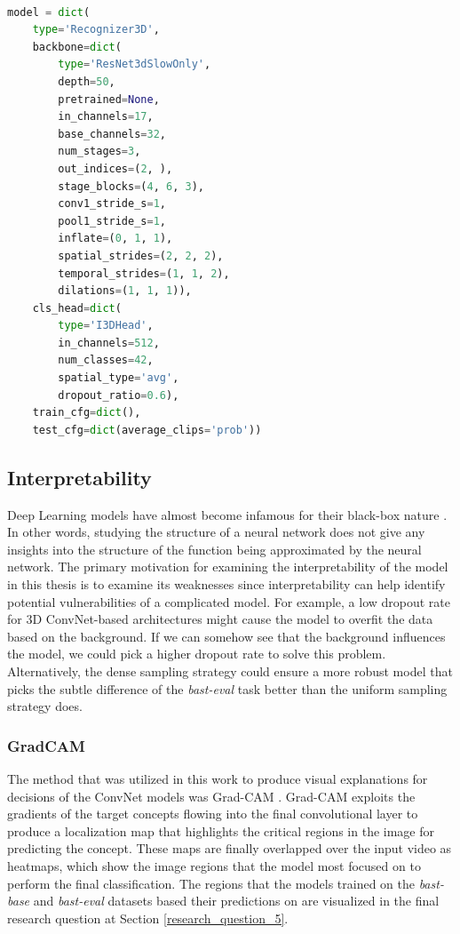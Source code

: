 \documentclass[extern,palatino]{cgMA}
\begin{document}
\bigskip \bigskip \bigskip
\vspace{5mm}
\begin{lstlisting}[language=Python, label={listing_slowfast_model}, caption={PoseC3D-SlowOnly model settings}]

model = dict(
    type='Recognizer3D',
    backbone=dict(
        type='ResNet3dSlowOnly',
        depth=50,
        pretrained=None,
        in_channels=17,
        base_channels=32,
        num_stages=3,
        out_indices=(2, ),
        stage_blocks=(4, 6, 3),
        conv1_stride_s=1,
        pool1_stride_s=1,
        inflate=(0, 1, 1),
        spatial_strides=(2, 2, 2),
        temporal_strides=(1, 1, 2),
        dilations=(1, 1, 1)),
    cls_head=dict(
        type='I3DHead',
        in_channels=512,
        num_classes=42,
        spatial_type='avg',
        dropout_ratio=0.6),
    train_cfg=dict(),
    test_cfg=dict(average_clips='prob'))

\end{lstlisting}
\vspace{5mm}

\newpage
\subsection{Interpretability}
\label{interpretability}
Deep Learning models have almost become infamous for their black-box nature \cite{fan2021interpretability}. In other words, studying the structure of a neural network does not give any insights into the structure of the function being approximated by the neural network. The primary motivation for examining the interpretability of the model in this thesis is to examine its weaknesses since interpretability can help identify potential vulnerabilities of a complicated model. For example, a low dropout rate for 3D ConvNet-based architectures might cause the model to overfit the data based on the background. If we can somehow see that the background influences the model, we could pick a higher dropout rate to solve this problem. Alternatively, the dense sampling strategy could ensure a more robust model that picks the subtle difference of the \textit{bast-eval} task better than the uniform sampling strategy does.

\subsubsection{GradCAM}
The method that was utilized in this work to produce visual explanations for decisions of the ConvNet models was Grad-CAM \cite{selvaraju2017grad}. Grad-CAM exploits the gradients of the target concepts flowing into the final convolutional layer to produce a localization map that highlights the critical regions in the image for predicting the concept. These maps are finally overlapped over the input video as heatmaps, which show the image regions that the model most focused on to perform the final classification. The regions that the models trained on the \textit{bast-base} and \textit{bast-eval} datasets based their predictions on are visualized in the final research question at Section \ref{research_question_5}. 
\end{document}
